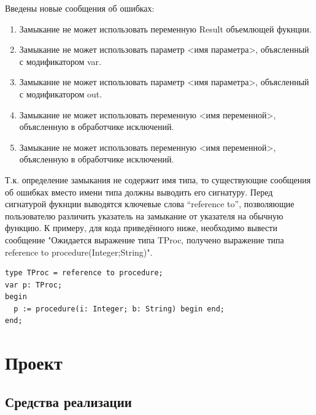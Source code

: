 \documentclass{imcs}
\begin{document}
Введены новые сообщения об ошибках:

\begin{enumerate}
  \item Замыкание не может использовать переменную Result объемлющей фукнции.
  \item Замыкание не может использовать параметр <имя параметра>, объясленный с модификатором var.
  \item Замыкание не может использовать параметр <имя параметра>, объясленный с модификатором out.
  \item Замыкание не может использовать переменную <имя переменной>, объясленную в обработчике исключений.
  \item Замыкание не может использовать переменную <имя переменной>, объясленную в обработчике исключений.    
\end{enumerate}

Т.к. определение замыкания не содержит имя типа, то существующие сообщения об ошибках вместо имени типа
должны выводить его сигнатуру. Перед сигнатурой фукнции выводятся ключевые слова ``reference to'', позволяющие
пользователю различить указатель на замыкание от указателя на обычную функцию. К примеру, для кода
приведённого ниже, необходимо вывести сообщение
"Ожидается выражение типа TProc, получено выражение типа reference to procedure(Integer;String)".

\begin{lstlisting}
type TProc = reference to procedure;
var p: TProc;
begin
  p := procedure(i: Integer; b: String) begin end;
end;
\end{lstlisting}

\section{Проект}

\iffalse

\subsection{Средства реализации}
\end{document}
